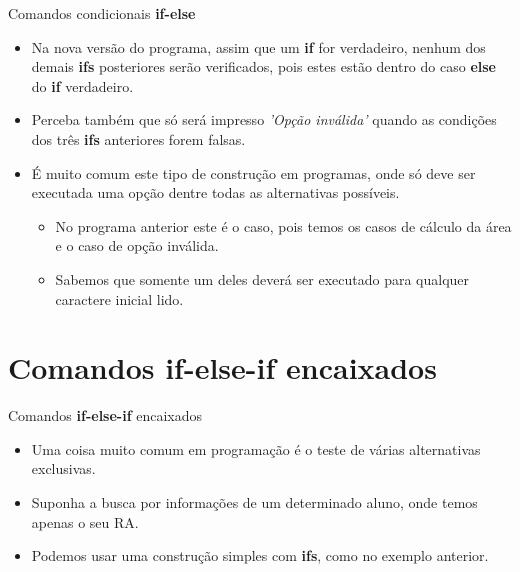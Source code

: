 \documentclass[handout]{beamer}
\begin{document}
\begin{frame}[fragile]{Comandos condicionais {\bf if-else}}

    \begin{itemize}[<+->]
        \item Na nova versão do programa, assim que um {\bf if} for verdadeiro, nenhum dos demais {\bf ifs} posteriores serão verificados, pois estes estão dentro do caso {\bf else} do {\bf if} verdadeiro.
        \item Perceba também que só será impresso {\it 'Opção inválida'} quando as condições dos três {\bf ifs} anteriores forem falsas.
        \item É muito comum este tipo de construção em programas, onde só deve ser executada uma opção dentre todas as alternativas possíveis.
        \begin{itemize}
            \item No programa anterior este é o caso, pois temos os casos de cálculo da área e o caso de opção inválida.
            \item Sabemos que somente um deles deverá ser executado para qualquer caractere inicial lido.
        \end{itemize}
    \end{itemize}
\end{frame}


\section{Comandos {\bf if-else-if} encaixados}

\begin{frame}[fragile]{Comandos {\bf if-else-if} encaixados}

    \begin{itemize}[<+->]
        \item Uma coisa muito comum em programação é o teste de várias alternativas exclusivas.
        \item Suponha a busca por informações de um determinado aluno, onde temos apenas o seu RA.
        \item Podemos usar uma construção simples com {\bf ifs}, como no exemplo anterior.
    \end{itemize}
\end{frame}
\end{document}
